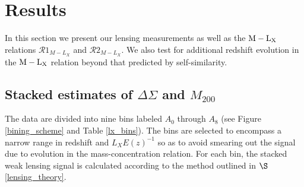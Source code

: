 \documentclass[12pt]{emulateapj}
\newcommand{\mlx}{$\rm{M} - \rm{L}_{\rm X}$ }
\begin{document}
\section{Results}\label{results}

In this section we present our lensing measurements as well as the
\mlx relations $\mathcal{R}1_{M-L_{X}}$ and
$\mathcal{R}2_{M-L_{X}}$. We also test for additional redshift
evolution in the \mlx relation beyond that predicted by
self-similarity.

\subsection{Stacked estimates of $\Delta\Sigma$ and $M_{200}$}\label{stacked_estimates}

The data are divided into nine bins labeled $A_0$ through $A_8$ (see
Figure \ref{bining_scheme} and Table \ref{lx_bins}). The bins are
selected to encompass a narrow range in redshift and $L_X E(z)^{-1}$
so as to avoid smearing out the signal due to evolution in the
mass-concentration relation. For each bin, the stacked weak lensing
signal is calculated according to the method outlined in
$\S$\ref{lensing_theory}.


\end{document}
